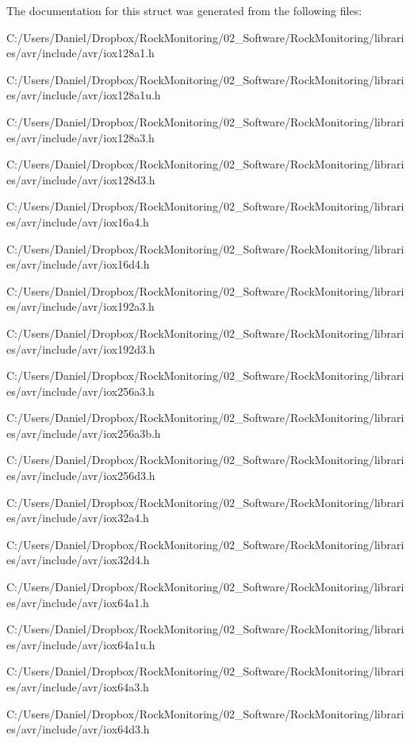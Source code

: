 The documentation for this struct was generated from the following files\+:\begin{DoxyCompactItemize}
\item 
C\+:/\+Users/\+Daniel/\+Dropbox/\+Rock\+Monitoring/02\+\_\+\+Software/\+Rock\+Monitoring/libraries/avr/include/avr/iox128a1.\+h\item 
C\+:/\+Users/\+Daniel/\+Dropbox/\+Rock\+Monitoring/02\+\_\+\+Software/\+Rock\+Monitoring/libraries/avr/include/avr/iox128a1u.\+h\item 
C\+:/\+Users/\+Daniel/\+Dropbox/\+Rock\+Monitoring/02\+\_\+\+Software/\+Rock\+Monitoring/libraries/avr/include/avr/iox128a3.\+h\item 
C\+:/\+Users/\+Daniel/\+Dropbox/\+Rock\+Monitoring/02\+\_\+\+Software/\+Rock\+Monitoring/libraries/avr/include/avr/iox128d3.\+h\item 
C\+:/\+Users/\+Daniel/\+Dropbox/\+Rock\+Monitoring/02\+\_\+\+Software/\+Rock\+Monitoring/libraries/avr/include/avr/iox16a4.\+h\item 
C\+:/\+Users/\+Daniel/\+Dropbox/\+Rock\+Monitoring/02\+\_\+\+Software/\+Rock\+Monitoring/libraries/avr/include/avr/iox16d4.\+h\item 
C\+:/\+Users/\+Daniel/\+Dropbox/\+Rock\+Monitoring/02\+\_\+\+Software/\+Rock\+Monitoring/libraries/avr/include/avr/iox192a3.\+h\item 
C\+:/\+Users/\+Daniel/\+Dropbox/\+Rock\+Monitoring/02\+\_\+\+Software/\+Rock\+Monitoring/libraries/avr/include/avr/iox192d3.\+h\item 
C\+:/\+Users/\+Daniel/\+Dropbox/\+Rock\+Monitoring/02\+\_\+\+Software/\+Rock\+Monitoring/libraries/avr/include/avr/iox256a3.\+h\item 
C\+:/\+Users/\+Daniel/\+Dropbox/\+Rock\+Monitoring/02\+\_\+\+Software/\+Rock\+Monitoring/libraries/avr/include/avr/iox256a3b.\+h\item 
C\+:/\+Users/\+Daniel/\+Dropbox/\+Rock\+Monitoring/02\+\_\+\+Software/\+Rock\+Monitoring/libraries/avr/include/avr/iox256d3.\+h\item 
C\+:/\+Users/\+Daniel/\+Dropbox/\+Rock\+Monitoring/02\+\_\+\+Software/\+Rock\+Monitoring/libraries/avr/include/avr/iox32a4.\+h\item 
C\+:/\+Users/\+Daniel/\+Dropbox/\+Rock\+Monitoring/02\+\_\+\+Software/\+Rock\+Monitoring/libraries/avr/include/avr/iox32d4.\+h\item 
C\+:/\+Users/\+Daniel/\+Dropbox/\+Rock\+Monitoring/02\+\_\+\+Software/\+Rock\+Monitoring/libraries/avr/include/avr/iox64a1.\+h\item 
C\+:/\+Users/\+Daniel/\+Dropbox/\+Rock\+Monitoring/02\+\_\+\+Software/\+Rock\+Monitoring/libraries/avr/include/avr/iox64a1u.\+h\item 
C\+:/\+Users/\+Daniel/\+Dropbox/\+Rock\+Monitoring/02\+\_\+\+Software/\+Rock\+Monitoring/libraries/avr/include/avr/iox64a3.\+h\item 
C\+:/\+Users/\+Daniel/\+Dropbox/\+Rock\+Monitoring/02\+\_\+\+Software/\+Rock\+Monitoring/libraries/avr/include/avr/iox64d3.\+h\end{DoxyCompactItemize}
